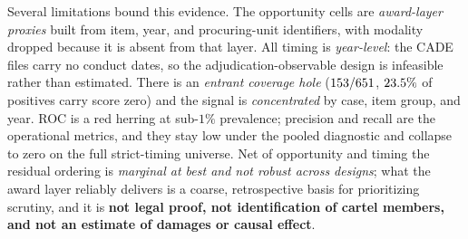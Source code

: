 Several limitations bound this evidence. The opportunity cells are
\emph{award-layer proxies} built from item, year, and procuring-unit
identifiers, with modality dropped because it is absent from that layer.
All timing is \emph{year-level}: the CADE files carry no conduct dates, so
the adjudication-observable design is infeasible rather than estimated.
There is an \emph{entrant coverage hole}
($153/651$, $23.5\%$ of
positives carry score zero) and the signal is \emph{concentrated} by case,
item group, and year. ROC is a red herring at sub-$1\%$ prevalence;
precision and recall are the operational metrics, and they stay low under
the pooled diagnostic and collapse to zero on the full strict-timing
universe. Net of opportunity and timing the residual ordering is
\emph{marginal at best and not robust across designs}; what the award
layer reliably delivers is a coarse, retrospective basis for prioritizing
scrutiny, and it is \textbf{not legal proof, not identification of cartel
members, and not an estimate of damages or causal effect}.
